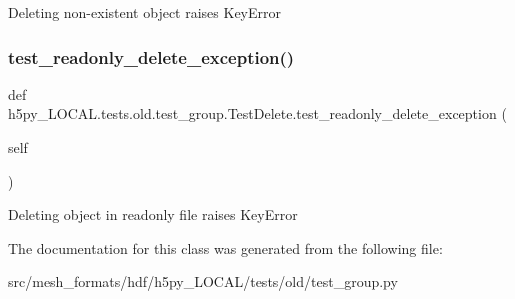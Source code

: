 \begin{DoxyVerb}Deleting non-existent object raises KeyError \end{DoxyVerb}
 \mbox{\label{classh5py__LOCAL_1_1tests_1_1old_1_1test__group_1_1TestDelete_aaa37e66e8cefd3534613f52b6724d312}} 
\subsubsection{\texorpdfstring{test\+\_\+readonly\+\_\+delete\+\_\+exception()}{test\_readonly\_delete\_exception()}}
{\footnotesize\ttfamily def h5py\+\_\+\+L\+O\+C\+A\+L.\+tests.\+old.\+test\+\_\+group.\+Test\+Delete.\+test\+\_\+readonly\+\_\+delete\+\_\+exception (\begin{DoxyParamCaption}\item[{}]{self }\end{DoxyParamCaption})}

\begin{DoxyVerb}Deleting object in readonly file raises KeyError \end{DoxyVerb}
 

The documentation for this class was generated from the following file\+:\begin{DoxyCompactItemize}
\item 
src/mesh\+\_\+formats/hdf/h5py\+\_\+\+L\+O\+C\+A\+L/tests/old/test\+\_\+group.\+py\end{DoxyCompactItemize}

